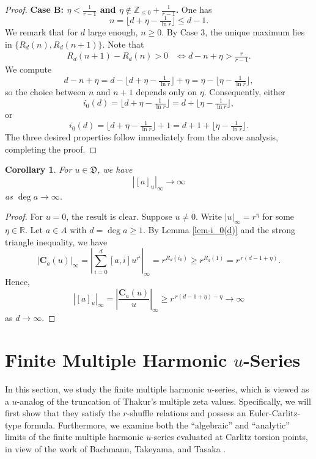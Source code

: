 \documentclass[12pt,reqno]{amsart}
\numberwithin{equation}{section}
\theoremstyle{plain}
\newtheorem{cor}[thm]{Corollary}
\theoremstyle{definition}
\theoremstyle{remark}
\newcommand{\RR}{\mathbb{R}}
\newcommand{\C}{\mathbf{C}}
\begin{document}
\begin{proof}
    \textbf{Case B: $\eta<\frac{1}{r-1}$ and $\eta\notin \mathbb{Z}_{\le 0}+\frac{1}{r-1}$.} One has 
    \[
        n=\lfloor d+\eta - \tfrac{1}{\ln r}\rfloor \le d-1.
    \]
    We remark that for $d$ large enough, $n\geq 0$. By Case 3, the unique maximum lies in $\{R_d(n),R_d(n+1)\}$. Note that
    \begin{align*}
        R_d(n+1)-R_d(n)>0 &
        \iff
        d-n+\eta > \frac{r}{r-1}.
    \end{align*}
    We compute
    \[
        d-n+\eta=d-\lfloor d+\eta-\tfrac{1}{\ln r}\rfloor+\eta
        =\eta-\lfloor \eta-\tfrac{1}{\ln r}\rfloor,
    \]
    so the choice between $n$ and $n+1$ depends only on $\eta$.  
    Consequently, either
    \[
        i_0(d)=\lfloor d+\eta-\tfrac{1}{\ln r}\rfloor
        = d+\lfloor \eta-\tfrac{1}{\ln r}\rfloor,
    \]
    or
    \[
        i_0(d)=\lfloor d+\eta-\tfrac{1}{\ln r}\rfloor+1
        = d+1+\lfloor \eta-\tfrac{1}{\ln r}\rfloor.
    \]
The three desired properties follow immediately from the above analysis, completing the proof.
\end{proof}

\begin{cor}\label{cor-[a]u-to-infty}
    For $u\in\mathfrak{D}$, we have
    \[
        |[a]_u|_\infty \to\infty
    \]
    as $\deg a\to\infty$.
\end{cor}

\begin{proof}
    For $u=0$, the result is clear. Suppose $u\neq 0$. Write $|u|_\infty=r^{\eta}$ for some $\eta\in\RR$. Let $a\in A$ with $d=\deg a\geq 1$. By Lemma \ref{lem-i_0(d)} and the strong triangle inequality, we have
    \[
        |\C_a(u)|_\infty
        = \left|\sum_{i=0}^d [a,i]u^{r^i}\right|_\infty
        = r^{R_{d}(i_0)}\geq r^{R_d(1)}=r^{\,r(d-1+\eta)}.
    \]
    Hence,
    \[
        |[a]_u|_\infty
        = \left|\frac{\C_a(u)}{u}\right|_\infty
        \ge r^{\,r(d-1+\eta)-\eta}
        \to \infty
    \]
    as $d\to\infty$.
\end{proof}
\section{Finite Multiple Harmonic \texorpdfstring{$u$}{u}-Series}\label{section:3}
In this section, we study the finite multiple harmonic $u$-series, which is viewed as a $u$-analog of the truncation of Thakur's multiple zeta values. Specifically, we will first show that they satisfy the $r$-shuffle relations and possess an Euler-Carlitz-type formula. Furthermore, we examine both the ``algebraic'' and ``analytic'' limits of the finite multiple harmonic $u$-series evaluated at Carlitz torsion points, in view of the work of Bachmann, Takeyama, and Tasaka \cite{BTT18}.
\end{document}

